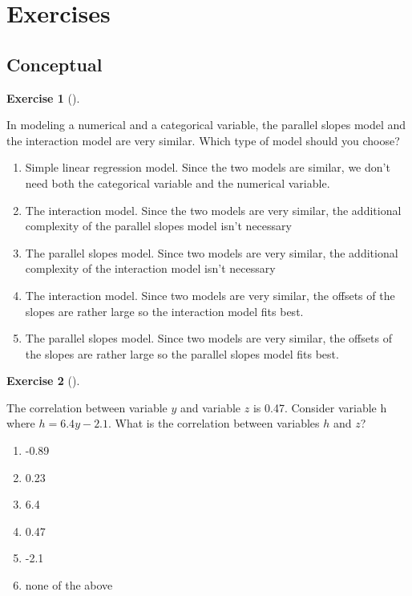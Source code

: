 \documentclass[
  letterpaper,
  DIV=11,
  numbers=noendperiod]{scrreprt}
\providecommand{\tightlist}{%
  \setlength{\itemsep}{0pt}\setlength{\parskip}{0pt}}\usepackage{longtable,booktabs,array}
\theoremstyle{definition}
\newtheorem{exercise}{Exercise}[chapter]
\theoremstyle{remark}
\begin{document}
\hypertarget{sec-ex06}{%
\section{Exercises}\label{sec-ex06}}

\hypertarget{sec-ex06-conceptual}{%
\subsection{Conceptual}\label{sec-ex06-conceptual}}

\begin{exercise}[]\protect\hypertarget{exr-ch06-c01}{}\label{exr-ch06-c01}

In modeling a numerical and a categorical variable, the parallel slopes
model and the interaction model are very similar. Which type of model
should you choose?

\begin{enumerate}
\def\labelenumi{\alph{enumi})}
\tightlist
\item
  Simple linear regression model. Since the two models are similar, we
  don't need both the categorical variable and the numerical variable.
\item
  The interaction model. Since the two models are very similar, the
  additional complexity of the parallel slopes model isn't necessary
\item
  The parallel slopes model. Since two models are very similar, the
  additional complexity of the interaction model isn't necessary
\item
  The interaction model. Since two models are very similar, the offsets
  of the slopes are rather large so the interaction model fits best.
\item
  The parallel slopes model. Since two models are very similar, the
  offsets of the slopes are rather large so the parallel slopes model
  fits best.
\end{enumerate}

\end{exercise}

\begin{exercise}[]\protect\hypertarget{exr-ch06-c02}{}\label{exr-ch06-c02}

The correlation between variable \(y\) and variable \(z\) is 0.47.
Consider variable h where \(h = 6.4y - 2.1\). What is the correlation
between variables \(h\) and \(z\)?

\begin{enumerate}
\def\labelenumi{\alph{enumi})}
\tightlist
\item
  -0.89
\item
  0.23
\item
  6.4
\item
  0.47
\item
  -2.1
\item
  none of the above
\end{enumerate}

\end{exercise}
\end{document}
